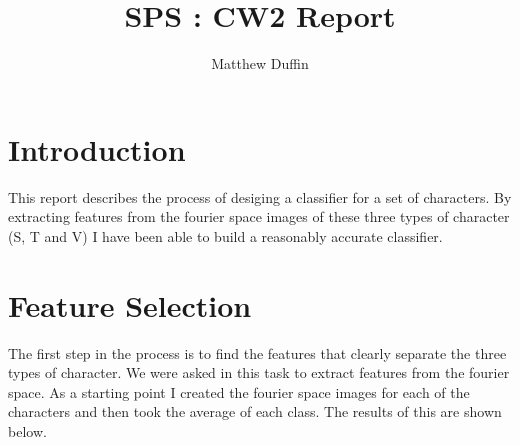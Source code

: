 \documentclass[11pt, a4paper]{article}
\title{SPS : CW2 Report}
\author{Matthew Duffin}
\begin{document}
\maketitle

\section{Introduction}
This report describes the process of desiging a classifier for a set of characters. By extracting features from the fourier space images of these three types of character (S, T and V) I have been able to build a reasonably accurate classifier. 

\section{Feature Selection}
The first step in the process is to find the features that clearly separate the three types of character. We were asked in this task to extract features from the fourier space. As a starting point I created the fourier space images for each of the characters and then took the average of each class. The results of this are shown below. 
\end{document}
